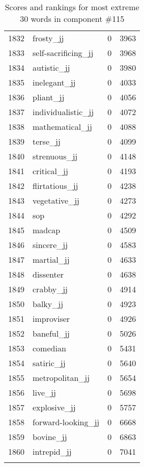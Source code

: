 \begin{longtable}[!htbp]{| rlr@{.}l |}
    1832 & frosty\_jj & 0 & 3963 \\
    1833 & self-sacrificing\_jj & 0 & 3968 \\
    1834 & autistic\_jj & 0 & 3980 \\
    1835 & inelegant\_jj & 0 & 4033 \\
    1836 & pliant\_jj & 0 & 4056 \\
    1837 & individualistic\_jj & 0 & 4072 \\
    1838 & mathematical\_jj & 0 & 4088 \\
    1839 & terse\_jj & 0 & 4099 \\
    1840 & strenuous\_jj & 0 & 4148 \\
    1841 & critical\_jj & 0 & 4193 \\
    1842 & flirtatious\_jj & 0 & 4238 \\
    1843 & vegetative\_jj & 0 & 4273 \\
    1844 & sop & 0 & 4292 \\
    1845 & madcap & 0 & 4509 \\
    1846 & sincere\_jj & 0 & 4583 \\
    1847 & martial\_jj & 0 & 4633 \\
    1848 & dissenter & 0 & 4638 \\
    1849 & crabby\_jj & 0 & 4914 \\
    1850 & balky\_jj & 0 & 4923 \\
    1851 & improviser & 0 & 4926 \\
    1852 & baneful\_jj & 0 & 5026 \\
    1853 & comedian & 0 & 5431 \\
    1854 & satiric\_jj & 0 & 5640 \\
    1855 & metropolitan\_jj & 0 & 5654 \\
    1856 & live\_jj & 0 & 5698 \\
    1857 & explosive\_jj & 0 & 5757 \\
    1858 & forward-looking\_jj & 0 & 6668 \\
    1859 & bovine\_jj & 0 & 6863 \\
    1860 & intrepid\_jj & 0 & 7041 \\
    \hline
    \caption{Scores and rankings for most extreme 30 words in component \#115} \\
\end{longtable}
